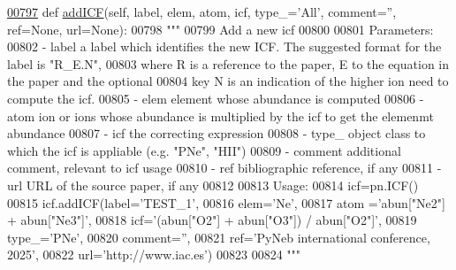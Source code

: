 \begin{DoxyCode}
\hypertarget{classpyneb_1_1core_1_1icf_1_1_i_c_f_l00797}{}\hyperlink{classpyneb_1_1core_1_1icf_1_1_i_c_f_a73cd32a765aaeaf1ac3dac231e9f0a72}{00797}     \textcolor{keyword}{def }\hyperlink{classpyneb_1_1core_1_1icf_1_1_i_c_f_a73cd32a765aaeaf1ac3dac231e9f0a72}{addICF}(self, label, elem, atom, icf, type\_='All', comment='', ref=None, url=None):
00798         \textcolor{stringliteral}{"""}
00799 \textcolor{stringliteral}{        Add a new icf}
00800 \textcolor{stringliteral}{        }
00801 \textcolor{stringliteral}{        Parameters:}
00802 \textcolor{stringliteral}{            - label    a label which identifies the new ICF. The suggested format for the label is "R\_E.N",
       }
00803 \textcolor{stringliteral}{                        where R is a reference to the paper, E to the equation in the paper and the
       optional }
00804 \textcolor{stringliteral}{                        key N is an indication of the higher ion need to compute the icf.  }
00805 \textcolor{stringliteral}{            - elem     element whose abundance is computed}
00806 \textcolor{stringliteral}{            - atom     ion or ions whose abundance is multiplied by the icf to get the elemenmt abundance}
00807 \textcolor{stringliteral}{            - icf      the correcting expression}
00808 \textcolor{stringliteral}{            - type\_     object class to which the icf is appliable (e.g. "PNe", "HII")}
00809 \textcolor{stringliteral}{            - comment  additional comment, relevant to icf usage}
00810 \textcolor{stringliteral}{            - ref      bibliographic reference, if any}
00811 \textcolor{stringliteral}{            - url      URL of the source paper, if any}
00812 \textcolor{stringliteral}{            }
00813 \textcolor{stringliteral}{        Usage:}
00814 \textcolor{stringliteral}{            icf=pn.ICF()}
00815 \textcolor{stringliteral}{            icf.addICF(label='TEST\_1',}
00816 \textcolor{stringliteral}{                        elem='Ne',}
00817 \textcolor{stringliteral}{                        atom ='abun["Ne2"] + abun["Ne3"]',}
00818 \textcolor{stringliteral}{                        icf='(abun["O2"] + abun["O3"]) / abun["O2"]',}
00819 \textcolor{stringliteral}{                        type\_='PNe',}
00820 \textcolor{stringliteral}{                        comment='',}
00821 \textcolor{stringliteral}{                        ref='PyNeb international conference, 2025',}
00822 \textcolor{stringliteral}{                        url='http://www.iac.es')}
00823 \textcolor{stringliteral}{}
00824 \textcolor{stringliteral}{        """}

\end{DoxyCode}
